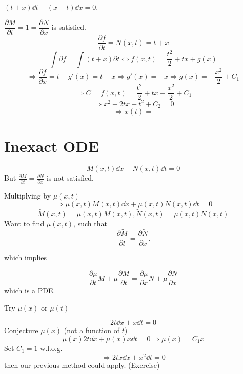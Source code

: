 \documentclass[twoside]{article}
\newcommand\pp{\partial}
\begin{document}
\begin{example}
    $(t+x)\dd t - (x-t) \dd x = 0$.

    $\dfrac{\partial M}{\partial t} = 1 = \dfrac{\partial N}{\partial x}$ is satisfied.
    $$\frac{\partial f}{\partial t} = N(x,t) = t+x $$
    $$\int {\partial f}= \int (t+x) \partial t \iff f(x,t) = \frac{t^2}{2} + tx + g(x)$$
    \[
    \Longrightarrow \frac{\partial f}{\partial x} = t + g'(x) = t-x \Longrightarrow g'(x) = -x \Longrightarrow g(x) = - \frac{x^2}{2} + C_1
    \]
    \[
    \Longrightarrow C = f(x,t) =  \frac{t^2}{2} + tx - \frac{x^2}{2} + C_1
    \]
    \[
    \Longrightarrow {x^2} -2tx - {t^2} + C_2 = 0
    \]
    \[
    \Longrightarrow x(t) =  
    \]
\end{example}

\section{Inexact ODE}

\begin{equation}
     M(x,t)\dd x + N(x,t)\dd t = 0
\end{equation}
But $\frac{\partial M}{\partial t} = \frac{\partial N}{\partial x}$ is not satisfied.

Multiplying by $\mu(x,t)$
\begin{equation}
    \Longrightarrow \mu(x,t) M(x,t)\dd x + \mu(x,t) N(x,t)\dd t = 0
\end{equation}
$$\tilde{M}(x,t) = \mu(x,t) M(x,t), \tilde{N}(x,t) = \mu(x,t) N(x,t)$$
Want to find $\mu(x,t)$, such that \[
    \frac{\partial \tilde{M}}{\partial t} = \frac{\partial \tilde{N}}{\partial x}.
\]

which implies

\[
    \frac{\pp \mu}{\pp t}M + \mu \frac{\pp M}{\pp t} = \frac{\pp \mu}{\pp x}N + \mu \frac{\pp N}{\pp x}
\]
which is a PDE.

Try $\mu(x)$ or $\mu(t)$

\begin{example}
    \[
    2t \dd x + x \dd t= 0
    \]
    Conjecture $\mu(x)$ (not a function of $t$)
    \[
    \mu(x)2t\dd x + \mu(x)x \dd t = 0 \Longrightarrow \mu(x) = C_1 x
    \]
    Set $C_1 = 1$ w.l.o.g.
    \[
    \Longrightarrow 2tx\dd x + x^2 \dd t = 0
    \]
    then our previous method could apply. (Exercise)
\end{example}
\end{document}
